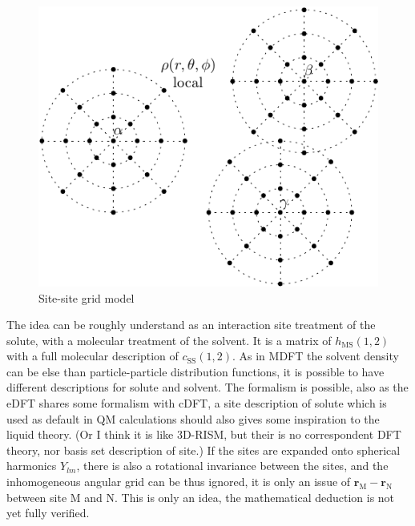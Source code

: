 \begin{figure}[h]
\begin{centering}
\includegraphics{_figure/site-site}
\par\end{centering}
\caption{Site-site grid model\label{fig:Site-site-grid-model}}
\end{figure}

The idea can be roughly understand as an interaction site treatment
of the solute, with a molecular treatment of the solvent. It is a
matrix of $h_{\text{MS}}(1,2)$ with a full molecular description
of $c_{\text{SS}}(1,2)$. As in \acs{MDFT} the solvent density can
be else than particle-particle distribution functions, it is possible
to have different descriptions for solute and solvent. The formalism
is possible, also as the e\acs{DFT} shares some formalism with c\acs{DFT},
a site description of solute which is used as default in \acs{QM}
calculations should also gives some inspiration to the liquid theory.
(Or I think it is like 3D-RISM, but their is no correspondent \acs{DFT}
theory, nor basis set description of site.) If the sites are expanded
onto spherical harmonics $Y_{lm}$, there is also a rotational invariance
between the sites, and the inhomogeneous angular grid can be thus
ignored, it is only an issue of $\mathbf{r}_{\text{M}}-\mathbf{r}_{\text{N}}$
between site M and N. This is only an idea, the mathematical deduction
is not yet fully verified.

